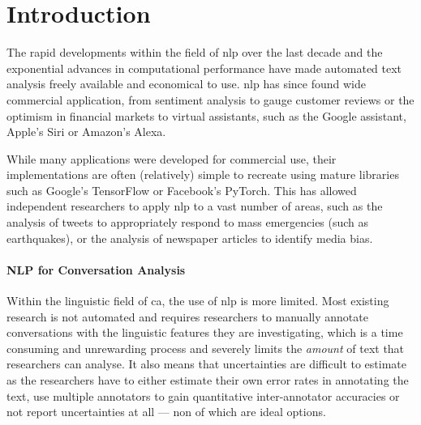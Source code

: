 \newpage
\renewcommand{\headrulewidth}{0.5pt}%
\chapter{Introduction}

The rapid developments within the field of \gls{nlp} over the last decade and the exponential advances in computational performance\cite{mooresLaw} have made automated text analysis freely available and economical to use. \Gls{nlp} has since found wide commercial application, from sentiment analysis to gauge customer reviews or the optimism in financial markets\cite{sentimentReview} to virtual assistants, such as the Google assistant, Apple's Siri or Amazon's Alexa\cite{virtualAssistants}.

While many applications were developed for commercial use, their implementations are often (relatively) simple to recreate using mature libraries such as Google's TensorFlow\cite{abadi2016tensorflow} or Facebook's PyTorch\cite{paszke2019pytorch}. This has allowed independent researchers to apply \gls{nlp} to a vast number of areas, such as the analysis of tweets to appropriately respond to mass emergencies (such as earthquakes)\cite{twitterEmergencies}, or the analysis of newspaper articles to identify media bias\cite{mediaBias}.

\subsubsection{NLP for Conversation Analysis}
Within the linguistic field of \gls{ca}, the use of \gls{nlp} is more limited. 
Most existing research is not automated and requires researchers to manually annotate conversations with the linguistic features they are investigating, which is a time consuming and unrewarding process and severely limits the \textit{amount} of text that researchers can analyse. It also means that uncertainties are difficult to estimate as the researchers have to either estimate their own error rates in annotating the text, use multiple annotators to gain quantitative inter-annotator accuracies or not report uncertainties at all --- non of which are ideal options.


